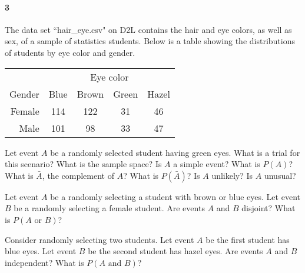 \documentclass{article}
\begin{document}
\begin{flushleft}
\begin{enumalpha}
\end{enumalpha}

\newpage
\paragraph{3} The data set ``hair\_eye.csv" on D2L contains the hair and eye colors, as well as sex, of a sample of statistics students. Below is a table showing the distributions of students by eye color and gender.\\
\medskip
\renewcommand{\arraystretch}{1}
{\centering
\begin{tabular}{ r| c c c c}
& \multicolumn{4}{c}{Eye color}\\
Gender & Blue & Brown & Green & Hazel\\
\hline
 Female &  114   &  122  &  31  &  46\\
 Male   & 101  &  98  &  33  &  47\\
\end{tabular}
\par}
\begin{enumalpha}
\item Let event $A$ be a randomly selected student having green eyes. What is a trial for this scenario? What is the sample space? Is $A$ a simple event? What is $P(A)$? What is $\bar A$, the complement of $A$? What is $P(\bar A)$? Is $A$ unlikely? Is $A$ unusual?
\vspace{2.25in}
\item Let event $A$ be a randomly selecting a student with brown or blue eyes. Let event $B$ be a randomly selecting a female student. Are events $A$ and $B$ disjoint? What is $P(A \text{ or } B)$?
\vspace{2.25in}
\item Consider randomly selecting two students. Let event $A$ be the first student has blue eyes. Let event $B$ be the second student has hazel eyes. Are events $A$ and $B$ independent? What is $P(A \text { and } B)$?

\end{enumalpha}



\end{flushleft}
\end{document}
